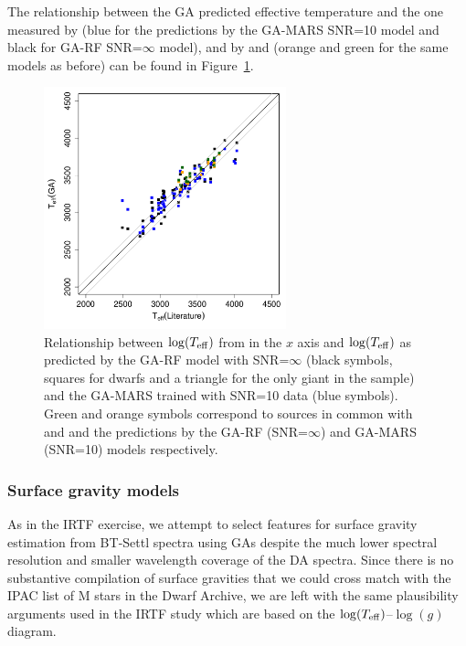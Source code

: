 The relationship between the GA predicted effective temperature and
the one measured by \cite{RA2012} (blue for the predictions by the
GA-MARS SNR=10 model and black for GA-RF SNR=$\infty$ model), and
by \cite{esm1} and \cite{esm2} (orange and green for
the same models as before) can be found in
Figure~\ref{fig:ipac_lt_lt}.

\begin{figure}
 \begin{center} \includegraphics[width=7cm]{figs/ipac_LG_Trojas_Tknn_10}

\caption{Relationship  between $\log(T_{\rm eff})$ from \protect\cite{RA2012}
in the $x$ axis and $\log(T_{\rm eff})$ as predicted by the GA-RF
 model with SNR=$\infty$ (black symbols, squares for dwarfs and a
 triangle for the only giant in the sample) and the GA-MARS trained
 with SNR=10 data (blue symbols). Green and orange symbols correspond
 to sources in common with \protect\cite{esm1}
 and \protect\cite{esm2} and the predictions by the
 GA-RF (SNR=$\infty$) and GA-MARS (SNR=10) models
 respectively.} \label{fig:ipac_lt_lt} \end{center}
\end{figure}



\subsubsection{Surface gravity models}

As in the IRTF exercise, we attempt to select features for surface
gravity estimation from BT-Settl spectra using GAs despite the much
lower spectral resolution and smaller wavelength coverage of the DA
spectra. Since there is no substantive compilation of surface
gravities that we could cross match with the IPAC list of M stars in
the Dwarf Archive, we are left with the same plausibility arguments
used in the IRTF study which are based on the $\log(T_{\rm
eff})$--$\log(g)$ diagram.

